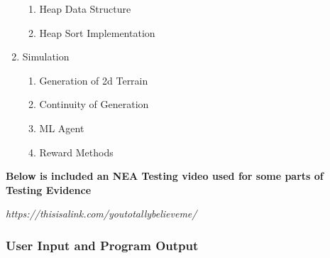 \begin{flushleft}
\begin{enumerate}
\begin{enumerate}
                \item Heap Data Structure
                \item Heap Sort Implementation
            \end{enumerate}
        \item Simulation
            \begin{enumerate}
                \item Generation of 2d Terrain
                \item Continuity of Generation
                \item ML Agent
                \item Reward Methods
            \end{enumerate}
    \end{enumerate}
    
    \pagebreak
    
    \begin{center}
        \large
        \textbf{Below is included an NEA Testing video used for some parts of Testing Evidence}
        
        \vspace{0.2cm}
        
        \Large
        \textit{https://thisisalink.com/youtotallybelieveme/}
    \end{center}
    
    \vspace{1cm}
    \subsubsection{User Input and Program Output}
    \vspace{0.5cm}
    

\end{flushleft}
